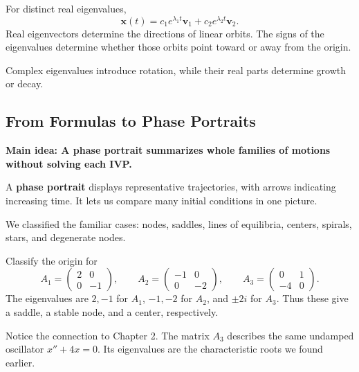 \documentclass[11pt,letterpaper]{article}
\begin{document}
For distinct real eigenvalues,
\[
\mathbf{x}(t)
=c_1e^{\lambda_1t}\mathbf{v}_1
+c_2e^{\lambda_2t}\mathbf{v}_2.
\]
Real eigenvectors determine the directions of
linear orbits. The signs of the eigenvalues
determine whether those orbits point toward
or away from the origin.

Complex eigenvalues introduce rotation, while
their real parts determine growth or decay.

\subsection{From Formulas to Phase Portraits}

\textbf{Main idea: A phase portrait summarizes whole families of motions without solving each IVP.}

A \textbf{phase portrait} displays representative
trajectories, with arrows indicating increasing time.
It lets us compare many initial conditions in one picture.

We classified the familiar cases:
nodes, saddles, lines of equilibria, centers,
spirals, stars, and degenerate nodes.

\begin{example}{    
Classify the origin for
\[
A_1=
\begin{pmatrix}2&0\\0&-1\end{pmatrix},
\qquad
A_2=
\begin{pmatrix}-1&0\\0&-2\end{pmatrix},
\qquad
A_3=
\begin{pmatrix}0&1\\-4&0\end{pmatrix}.
\]
}
The eigenvalues are $2,-1$ for $A_1$,
$-1,-2$ for $A_2$, and $\pm2i$ for $A_3$.
Thus these give a saddle, a stable node, and a
center, respectively.

Notice the connection to Chapter 2. The matrix
$A_3$ describes the same undamped oscillator
$x''+4x=0$. Its eigenvalues are the characteristic
roots we found earlier.
\end{example}


\end{document}
